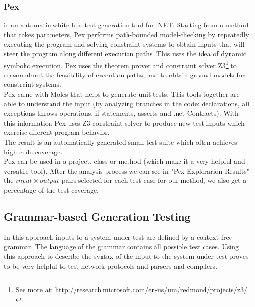 \documentclass[10pt, conference, compsocconf]{IEEEtran}
\begin{document}
\subsubsection{\textbf{Pex}\cite{Tillmann:2008:PWB:1792786.1792798}} is an automatic white-box test generation tool for .NET. Starting from a method that takes parameters, Pex performs path-bounded model-checking
by repeatedly executing the program and solving constraint systems to obtain inputs that will steer the program along different execution paths.
This uses the idea of dynamic symbolic execution\cite{Tillmann06unittests}. Pex uses the theorem prover and
constraint solver Z3\footnote{See more at: \url{http://research.microsoft.com/en-us/um/redmond/projects/z3/}} to reason about the feasibility of execution paths, and
to obtain ground models for constraint systems.\\
Pex came with Moles that helps to generate unit tests. This tools together are able to understand the input (by analyzing branches in the code:
declarations, all exceptions throws operations, if statements, asserts and .net Contracts). With this information Pex uses Z3 constraint solver to
produce new test inputs which exercise diferent program behavior.\\
The result is an automatically generated small test suite which often achieves high code coverage.\\
Pex can be used in a project, class or method (which make it a very helpful and versatile tool). After the analysis process we can see in "Pex Explorarion Results"
the $input \times output$ pairs selected for each test case for our method, we also get a percentage of the test coverage.

\subsection{Grammar-based Generation Testing}
In this approach inputs to a system under test are defined by a context-free grammar. The language of the grammar contains all possible test cases.
Using this approach to describe the syntax of the input to the system under test proves to be very helpful to test
network protocols\cite{tal:syntax-based,kaksonen2001functional} and parsers and compilers\cite{1994-burgess,Burgess_Saidi_1996}.
\end{document}
